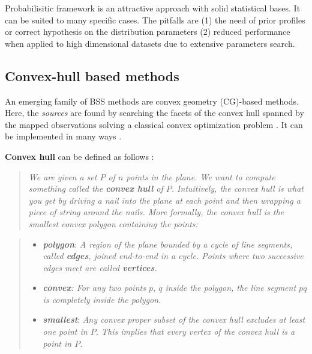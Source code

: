 \documentclass[12pt,]{book}
\theoremstyle{definition}
\theoremstyle{definition}
\theoremstyle{definition}
\theoremstyle{remark}
\begin{document}
Probabilisitic framework is an attractive approach with solid
statistical bases. It can be suited to many specific cases. The pitfalls
are (1) the need of prior profiles or correct hypothesis on the
distribution parameters (2) reduced performance when applied to high
dimensional datasets due to extensive parameters search.

\hypertarget{convex-hull-based-methods}{%
\subsection{Convex-hull based methods}\label{convex-hull-based-methods}}

An emerging family of BSS methods are convex geometry (CG)-based
methods. Here, the \emph{sources} are found by searching the facets of
the convex hull spanned by the mapped observations solving a classical
convex optimization problem \citep{Yang2015}. It can be implemented in
many ways \citep{Preparata1985}.

\textbf{Convex hull} can be defined as follows \citep{Erickson2018}:

\begin{quote}
\emph{We are given a set \(P\) of \(n\) points in the plane. We want to
compute something called the \textbf{convex hull} of \(P\). Intuitively,
the convex hull is what you get by driving a nail into the plane at each
point and then wrapping a piece of string around the nails. More
formally, the convex hull is the smallest convex polygon containing the
points:}
\end{quote}

\begin{quote}
\begin{itemize}
\item
  \emph{\textbf{polygon}}: \emph{A region of the plane bounded by a
  cycle of line segments, called \textbf{edges}, joined end-to-end in a
  cycle. Points where two successive edges meet are called
  \textbf{vertices}.}
\item
  \emph{\textbf{convex}: For any two points \(p\), \(q\) inside the
  polygon, the line segment \(pq\) is completely inside the polygon.}
\item
  \emph{\textbf{smallest}}: \emph{Any convex proper subset of the convex
  hull excludes at least one point in \(P\). This implies that every
  vertex of the convex hull is a point in \(P\).}
\end{itemize}
\end{quote}
\end{document}
